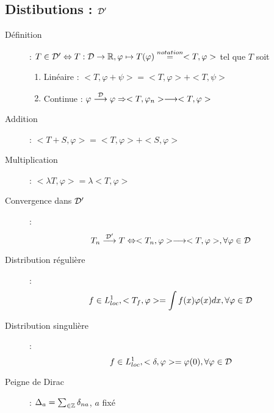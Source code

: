 \subsection{Distibutions : $\mathcal{D}'$}
\begin{description}
\item[Définition] : $T\in\mathcal{D}'\Leftrightarrow T:\mathcal{D}\rightarrow\mathbb{R},\varphi\mapsto T(\varphi)\overset{notation}{=}<T,\varphi>$ tel que $T$ soit
    \begin{enumerate}
        \item Linéaire : $<T,\varphi+\psi>=<T,\varphi>+<T,\psi>$
        \item Continue : $\varphi\overset{\mathcal{D}}{\longrightarrow}\varphi
        \Rightarrow
        <T,\varphi_n>\longrightarrow <T,\varphi>$
    \end{enumerate}
\item[Addition] : $<T+S, \varphi>=<T,\varphi>+<S,\varphi>$
\item[Multiplication] : $<\lambda T,\varphi>=\lambda<T,\varphi>$
\item[Convergence dans $\mathcal{D}'$] :
    \[
        T_n\overset{\mathcal{D}'}{\longrightarrow}T
        \Leftrightarrow
        <T_n,\varphi>\longrightarrow<T,\varphi>,\forall\varphi\in\mathcal{D}
    \]
\item[Distribution régulière] :
    \[
        f\in L^1_{loc}, <T_f,\varphi>=\int f(x)\varphi(x)dx,\forall\varphi\in\mathcal{D}
    \]
\item[Distribution singulière] :
    \[
        f\in L^1_{loc}, <\delta, \varphi>=\varphi(0),\forall\varphi\in\mathcal{D}
    \]
\item[Peigne de Dirac] : $\Delta_a=\sum_{\in\mathbb{Z}}\delta_{na}$, $a$ fixé
\end{description}